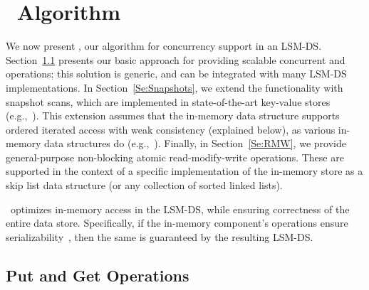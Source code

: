 \newcommand{\RW}{\italMathId{RW}}
\newcommand{\size}{\italMathId{size}}
\newcommand{\Sizeof}{\italMathId{sizeof}}
\newcommand{\LIMIT}{\italMathId{LIMIT}}

\section{\clsm\ Algorithm}
\label{sec:algorithm}

We now present \clsm, our algorithm for concurrency support in an LSM-DS.
Section~\ref{Se:Basic} presents our basic approach for providing scalable concurrent  and  operations; this solution is generic, and can be integrated with many LSM-DS implementations.
In Section~\ref{Se:Snapshots}, we extend the functionality with snapshot scans,
which are implemented in state-of-the-art key-value stores (e.g.,~\cite{leveldb,Hyperdex2012}).
This extension assumes that the in-memory data structure supports ordered iterated access with weak consistency (explained below),
as various in-memory data structures do (e.g.,~\cite{ConcurrentSkipListMap,bronson2010practical,libcds}).
Finally, in Section~\ref{Se:RMW}, we provide general-purpose
non-blocking atomic read-modify-write operations. These are supported in the context of a specific implementation of the
in-memory store as a skip list data structure (or any collection of sorted linked lists).

\clsm\ optimizes in-memory access in the LSM-DS, while ensuring correctness of the entire data store.
Specifically, if the in-memory component's operations ensure
serializability~\cite{Papadimitriou1979}, then the same is guaranteed by the
resulting LSM-DS.


\subsection{Put and Get Operations}
\label{Se:Basic}

